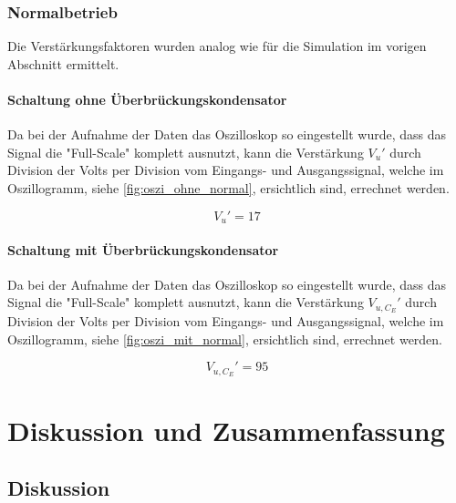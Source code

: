 \documentclass[12pt,english,ngerman]{scrartcl}
\begin{document}
\subsubsection{Normalbetrieb}
Die Verstärkungsfaktoren wurden analog wie für die Simulation im
vorigen Abschnitt  ermittelt.

\paragraph{Schaltung ohne Überbrückungskondensator}

Da bei der Aufnahme der Daten das Oszilloskop so eingestellt wurde, dass das
Signal die "Full-Scale" komplett ausnutzt, kann die Verstärkung $V_{u}'$ durch
Division der Volts per Division vom Eingangs- und Ausgangssignal, welche im
Oszillogramm, siehe \autoref{fig:oszi_ohne_normal}, ersichtlich sind, errechnet
werden.

\begin{equation}
  V_{u}' = 17
  \label{eq:oszi_verst_ohne}
\end{equation}

\paragraph{Schaltung mit Überbrückungskondensator}

Da bei der Aufnahme der Daten das Oszilloskop so eingestellt wurde, dass das
Signal die "Full-Scale" komplett ausnutzt, kann die Verstärkung $V_{u,C_{E}}'$
durch Division der Volts per Division vom Eingangs- und Ausgangssignal,
welche im Oszillogramm, siehe \autoref{fig:oszi_mit_normal}, ersichtlich sind,
errechnet werden.

\begin{equation}
  V_{u,C_{E}}' = 95
  \label{eq:oszi_verst_mit}
\end{equation}



\section{Diskussion und Zusammenfassung}\label{sec:Diskussion} 
\subsection{Diskussion}
\end{document}
